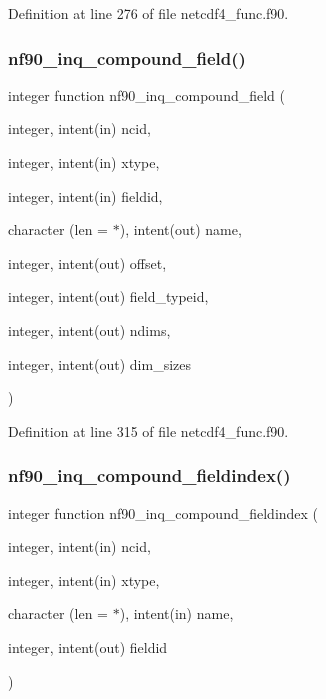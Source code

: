 Definition at line 276 of file netcdf4\+\_\+func.\+f90.

\mbox{\label{netcdf4__func_8f90_aec2d2e8b7f4228df93a8c97512afb954}} 
\subsubsection{\texorpdfstring{nf90\+\_\+inq\+\_\+compound\+\_\+field()}{nf90\_inq\_compound\_field()}}
{\footnotesize\ttfamily integer function nf90\+\_\+inq\+\_\+compound\+\_\+field (\begin{DoxyParamCaption}\item[{integer, intent(in)}]{ncid,  }\item[{integer, intent(in)}]{xtype,  }\item[{integer, intent(in)}]{fieldid,  }\item[{character (len = $\ast$), intent(out)}]{name,  }\item[{integer, intent(out)}]{offset,  }\item[{integer, intent(out)}]{field\+\_\+typeid,  }\item[{integer, intent(out)}]{ndims,  }\item[{integer, intent(out)}]{dim\+\_\+sizes }\end{DoxyParamCaption})}



Definition at line 315 of file netcdf4\+\_\+func.\+f90.

\mbox{\label{netcdf4__func_8f90_a836c25c9096336fb488ed8f932d33ca5}} 
\subsubsection{\texorpdfstring{nf90\+\_\+inq\+\_\+compound\+\_\+fieldindex()}{nf90\_inq\_compound\_fieldindex()}}
{\footnotesize\ttfamily integer function nf90\+\_\+inq\+\_\+compound\+\_\+fieldindex (\begin{DoxyParamCaption}\item[{integer, intent(in)}]{ncid,  }\item[{integer, intent(in)}]{xtype,  }\item[{character (len = $\ast$), intent(in)}]{name,  }\item[{integer, intent(out)}]{fieldid }\end{DoxyParamCaption})}



